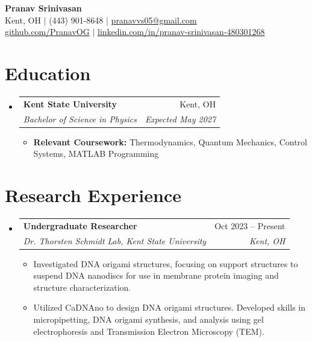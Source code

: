 \documentclass[11pt, letterpaper]{article}
\makeatletter
\newcommand{\resumeItem}[1]{\item\small{#1}}
\newcommand{\resumeSubheading}[4]{
  \vspace{-1pt}\item
    \begin{tabular*}{0.97\textwidth}[t]{l@{\extracolsep{\fill}}r}
      \textbf{#1} & #2 \\
      \textit{\small#3} & \textit{\small #4} \\
    \end{tabular*}\vspace{-5pt}
}
\makeatother
\begin{document}
\thispagestyle{empty}

\begin{center}
    {\Huge \textbf{Pranav Srinivasan}} \\ \vspace{4pt}
    Kent, OH $|$ (443) 901-8648 $|$ \href{mailto:pranavvs05@gmail.com}{pranavvs05@gmail.com} \\
    \href{https://github.com/PranavOG}{github.com/PranavOG} $|$ \href{https://linkedin.com/in/pranav-srinivasan-480301268}{linkedin.com/in/pranav-srinivasan-480301268}
\end{center}

\section{Education}
\begin{itemize}[leftmargin=0.15in, label={}]
    \resumeSubheading
        {Kent State University}{Kent, OH}
        {Bachelor of Science in Physics}{Expected May 2027}
        \vspace{2pt}
        \begin{itemize}[leftmargin=0.15in, label={$\bullet$}]
            \resumeItem{\textbf{Relevant Coursework:} Thermodynamics, Quantum Mechanics, Control Systems, MATLAB Programming}
        \end{itemize}
\end{itemize}

\section{Research Experience}
\begin{itemize}[leftmargin=0.15in, label={}]
    \resumeSubheading
        {Undergraduate Researcher}{Oct 2023 -- Present}
        {Dr. Thorsten Schmidt Lab, Kent State University}{Kent, OH}
        \begin{itemize}[leftmargin=0.15in, label={$\bullet$}]
            \resumeItem{Investigated DNA origami structures, focusing on support structures to suspend DNA nanodiscs for use in membrane protein imaging and structure characterization.}
            \resumeItem{Utilized CaDNAno to design DNA origami structures. Developed skills in micropipetting, DNA origami synthesis, and analysis using gel electrophoresis and Transmission Electron Microscopy (TEM).}
        \end{itemize}
\end{itemize}
\end{document}
